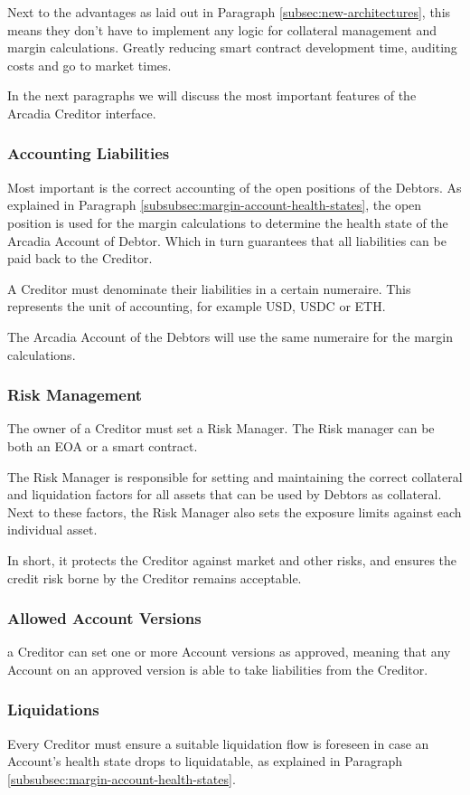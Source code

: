 \documentclass[sigconf,nonacm]{acmart}
\begin{document}
Next to the advantages as laid out in Paragraph \ref{subsec:new-architectures},
this means they don't have to implement any logic for collateral management and margin calculations.
Greatly reducing smart contract development time, auditing costs and go to market times.

In the next paragraphs we will discuss the most important features of the Arcadia Creditor interface.

\subsubsection{Accounting Liabilities}
Most important is the correct accounting of the open positions of the Debtors.
As explained in Paragraph \ref{subsubsec:margin-account-health-states},
the open position is used for the margin calculations to determine the health state of the Arcadia Account of Debtor.
Which in turn guarantees that all liabilities can be paid back to the Creditor.

A Creditor must denominate their liabilities in a certain numeraire.
This represents the unit of accounting, for example USD, USDC or ETH.

The Arcadia Account of the Debtors will use the same numeraire for the margin calculations.

\subsubsection{Risk Management}
The owner of a Creditor must set a Risk Manager.
The Risk manager can be both an EOA or a smart contract.

The Risk Manager is responsible for setting and maintaining the correct collateral and liquidation factors for all assets that can be used by Debtors as collateral.
Next to these factors, the Risk Manager also sets the exposure limits against each individual asset. 

In short, it protects the Creditor against market and other risks, and ensures the credit risk borne by the Creditor remains acceptable.

\subsubsection{Allowed Account Versions}
a Creditor can set one or more Account versions as approved,
meaning that any Account on an approved version is able to take liabilities from the Creditor.

\subsubsection{Liquidations}
Every Creditor must ensure a suitable liquidation flow is foreseen in case an Account's health state drops to liquidatable,
as explained in Paragraph \ref{subsubsec:margin-account-health-states}.
\end{document}
